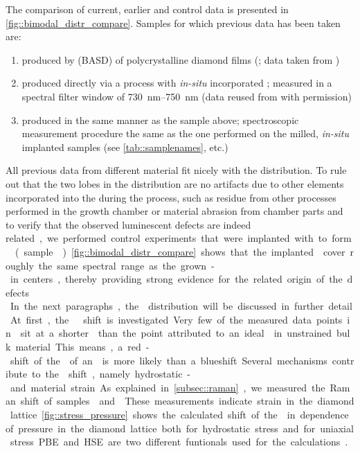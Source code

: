 	The comparison of current, earlier and control data is presented in \autoref{fig::bimodal_distr_compare}.
	Samples for which previous data has been taken are:
	\begin{enumerate}
		\item \nds produced by \basd (BASD) of polycrystalline \CVD diamond films (\cite{Neu2011a}; data taken from \cite{Benedikter2017a})
		\item \nds produced directly via a \CVD process with \textit{in-situ} incorporated \sivs; measured in a spectral filter window of \SIrange{730}{750}{nm} (data reused from \cite{Neu2012} with permission)
		\item \nds produced in the same manner as the sample above; spectroscopic measurement procedure the same as the one performed on the milled, \textit{in-situ} implanted samples (see \autoref{tab::samplenames}, \insituF etc.)
	\end{enumerate}
	All previous data from different \nd material fit nicely with the \ZPL distribution.
	To rule out that the two lobes in the distribution are no artifacts due to other elements incorporated into the \nds during the process, such as residue from other processes performed in the growth chamber or material abrasion from chamber parts and to verify that the observed luminescent defects are indeed \si related, we performed control experiments that were implanted with \si to form \sivs (sample \implantedTao).
	\autoref{fig::bimodal_distr_compare} shows that the implanted \sivs cover roughly the same spectral range as the grown-in centers, thereby providing strong evidence for the \si related origin of the defects.
	\\
	In the next paragraphs, the \ZPL distribution will be discussed in further detail.
	At first, the \ZPL \cwl shift is investigated.
	Very few of the measured data points in \vl sit at a shorter \cwl than the point attributed to an ideal \siv in unstrained bulk material.
	This means, a red-shift of the \ZPL of an \siv is more likely than a blueshift.
	Several mechanisms contribute to the \cwl shift, namely hydrostatic- and material strain.
	As explained in \autoref{subsec::raman}, we measured the Raman shift of samples \insituS and \implantedTao.
	These measurements indicate strain in the diamond lattice.
	\autoref{fig::stress_pressure} shows the calculated shift of the  \ZPL in dependence of pressure in the diamond lattice both for hydrostatic stress and for uniaxial stress.
	PBE and HSE are two different funtionals used for the calculations .
